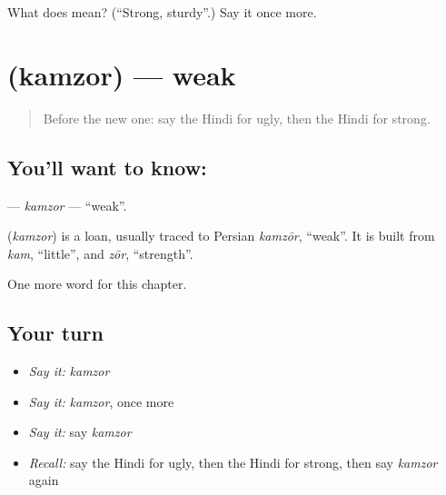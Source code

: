 \begin{tcolorbox}[breakable,colback=teal!4,colframe=teal!35!black,title={Before you move on}]
What does  mean? (\textquotedblleft{}Strong, sturdy\textquotedblright{}.) Say it once more.
\end{tcolorbox}
\section[\texorpdfstring{\hi{कमज़ोर} (kamzor)}{कमज़ोर (kamzor)}]{ (kamzor) — weak}

\label{lesson:HI-C212-kamzor}



\begin{quote}
Before the new one: say the Hindi for ugly, then the Hindi for strong.
\end{quote}

\subsection*{You'll want to know: }
\textbf{} — \emph{kamzor} — \textquotedblleft{}weak\textquotedblright{}.

\begin{cousinweb}
\textbf{} (\emph{kamzor}) is a loan, usually traced to Persian \emph{kamzōr}, \textquotedblleft{}weak\textquotedblright{}. It is built from \emph{kam}, \textquotedblleft{}little\textquotedblright{}, and \emph{zōr}, \textquotedblleft{}strength\textquotedblright{}.
\end{cousinweb}

\begin{grammarlens}[title={What you've built}]
One more word for this chapter.
\end{grammarlens}

\subsection*{Your turn}
\begin{itemize}
\raggedright
  \item \emph{Say it:} \emph{kamzor}
  \item \emph{Say it:} \emph{kamzor}, once more
  \item \emph{Say it:} say \emph{kamzor}
  \item \emph{Recall:} say the Hindi for ugly, then the Hindi for strong, then say \emph{kamzor} again
\end{itemize}

